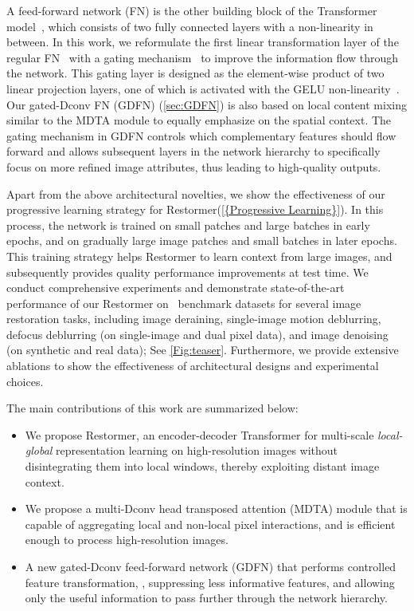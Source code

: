 \documentclass[10pt,twocolumn,letterpaper]{article}
\def\xnet{Restormer\xspace}
\begin{document}
A feed-forward network (FN) is the other building block of the Transformer model~\cite{vaswani2017attention}, which consists of two fully connected layers with a non-linearity in between.  In this work, we reformulate the first linear transformation layer of the regular FN~\cite{vaswani2017attention} with a gating mechanism~\cite{dauphin2017language_gating} to improve the information flow through the network.
This gating layer is designed as the element-wise product of two linear projection layers, one of which is activated with the GELU non-linearity~\cite{hendrycks2016gaussian_gelu}. 
Our gated-Dconv FN (GDFN) (\cref{sec:GDFN}) is also based on local content mixing similar to {the} MDTA module to equally emphasize on the spatial context. 
The gating mechanism in GDFN controls which complementary features should flow forward and allows subsequent layers in the network hierarchy to specifically focus on more refined image attributes, thus leading to high-quality outputs. 

Apart from the above architectural novelties, we show the effectiveness of our progressive learning strategy for \xnet (\cref{{Progressive Learning}}). 
In this process, the network is trained on small patches and large batches in early epochs, and on gradually large image patches and small batches in later epochs. 
This training strategy helps \xnet to learn context from large images, and subsequently provides quality performance improvements at test time. 
We conduct comprehensive experiments and demonstrate state-of-the-art performance of our \xnet on ~benchmark datasets for several image restoration tasks, including image deraining, single-image motion deblurring, defocus deblurring (on single-image and dual pixel data), and image denoising (on synthetic and real data); See \cref{Fig:teaser}. 
Furthermore, we provide extensive ablations to show the effectiveness of architectural designs and experimental choices.  

\noindent The main contributions of this work are summarized below: \vspace{-1.7em}
\begin{itemize}[leftmargin=*]\setlength{\itemsep}{-0.2em}
     \item We propose \xnet, an encoder-decoder Transformer for multi-scale \emph{local-global} representation learning on high-resolution images without disintegrating them into local windows, thereby exploiting  distant image context.  
    \item We propose a multi-Dconv head transposed attention (MDTA) module that is capable of aggregating local and non-local pixel interactions, and is efficient enough to process high-resolution images.
    \item A new gated-Dconv feed-forward network (GDFN) that performs controlled feature transformation, \ie, suppressing less informative features, and allowing only the useful information to pass further through the network hierarchy. 
\end{itemize}
\end{document}
